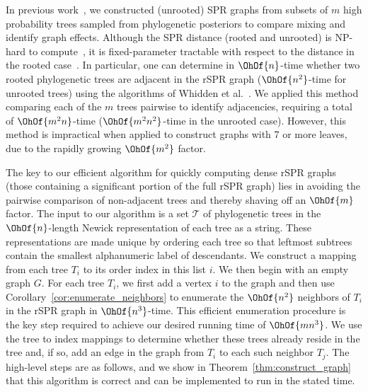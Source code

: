 \documentclass[11pt,onecolumn,conference]{IEEEtran}
\begin{document}
In previous work~\cite{Whidden2015-yi}, we constructed (unrooted) SPR graphs from subsets of $m$ high probability trees sampled from phylogenetic posteriors to compare mixing and identify graph effects.
Although the SPR distance (rooted and unrooted) is NP-hard to compute~\cite{bordewich05,hickey2008sdc}, it is fixed-parameter tractable with respect to the distance in the rooted case~\cite{bordewich05}.
In particular, one can determine in $\OhOf{n}$-time whether two rooted phylogenetic trees are adjacent in the rSPR graph ($\OhOf{n^2}$-time for unrooted trees) using the algorithms of Whidden et al.~\cite{whidden2009unifying,whidden2010fast, whidden2013hybridization,Whidden2015-yi}.
We applied this method comparing each of the $m$ trees pairwise to identify adjacencies, requiring a total of $\OhOf{m^2n}$-time ($\OhOf{m^2 n^2}$-time in the unrooted case).
However, this method is impractical when applied to construct graphs with 7 or more leaves, due to the rapidly growing $\OhOf{m^2}$ factor.

The key to our efficient algorithm for quickly computing dense rSPR graphs (those containing a significant portion of the full rSPR graph) lies in avoiding the pairwise comparison of non-adjacent trees and thereby shaving off an $\OhOf{m}$ factor.
The input to our algorithm is a set $\mathcal{T}$ of phylogenetic trees in the $\OhOf{n}$-length Newick \cite{wiki:newick} representation of each tree as a string.
These representations are made unique by ordering each tree so that leftmost subtrees contain the smallest alphanumeric label of descendants.
We construct a mapping from each tree $T_i$ to its order index in this list $i$.
We then begin with an empty graph $G$.
For each tree $T_i$, we first add a vertex $i$ to the graph and then use Corollary~\ref{cor:enumerate_neighbors} to enumerate the $\OhOf{n^2}$ neighbors of $T_i$ in the rSPR graph in $\OhOf{n^3}$-time.
This efficient enumeration procedure is the key step required to achieve our desired running time of $\OhOf{mn^3}$.
We use the tree to index mappings to determine whether these trees already reside in the tree and, if so, add an edge in the graph from $T_i$ to each such neighbor $T_j$.
The high-level steps are as follows, and we show in Theorem~\ref{thm:construct_graph} that this algorithm is correct and can be implemented to run in the stated time.
\end{document}
